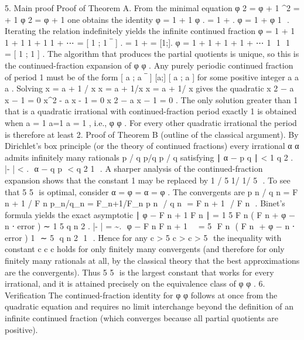 {{{{{{5. Main proof
Proof of Theorem A.
From the minimal equation
φ
2
=
φ
+
1
\varphi^2 = \varphi + 1
φ
2
=
φ
+
1
one obtains the identity
φ
=
1
+
1
φ
.
\varphi = 1 + .
φ
=
1
+
φ
1
​
.
Iterating the relation indefinitely yields the infinite continued fraction
φ
=
1
+
1
1
+
1
1
+
1
1
+
⋯
=
[
1
;
1
‾
]
.
\varphi = 1 +  = [1;].
φ
=
1
+
1
+
1
+
1
+
⋯
1
​
1
​
1
​
=
[
1
;
1
]
.
The algorithm that produces the partial quotients is unique, so this is the continued-fraction expansion of
φ
\varphi
φ
.
Any purely periodic continued fraction of period 1 must be of the form
[
a
;
a
‾
]
[a;]
[
a
;
a
]
for some positive integer
a
a
a
. Solving
x
=
a
+
1
/
x
x = a + 1/x
x
=
a
+
1/
x
gives the quadratic
x
2
−
a
x
−
1
=
0
x^2 - a x - 1 = 0
x
2
−
a
x
−
1
=
0
. The only solution greater than 1 that is a quadratic irrational with continued-fraction period exactly 1 is obtained when
a
=
1
a=1
a
=
1
, i.e.,
φ
\varphi
φ
. For every other quadratic irrational the period is therefore at least 2.
Proof of Theorem B (outline of the classical argument).
By Dirichlet’s box principle (or the theory of continued fractions) every irrational
α
\alpha
α
admits infinitely many rationals
p
/
q
p/q
p
/
q
satisfying
∣
α
−
p
q
∣
<
1
q
2
.
\bigl|\alpha - \bigr| < .
​
α
−
q
p
​
​
<
q
2
1
​
.
A sharper analysis of the continued-fraction expansion shows that the constant 1 may be replaced by
1
/
5
1/
1/
5
​
.
To see that
5
5
​
is optimal, consider
α
=
φ
\alpha = \varphi
α
=
φ
. The convergents are
p
n
/
q
n
=
F
n
+
1
/
F
n
p_n/q_n = F_{n+1}/F_n
p
n
​
/
q
n
​
=
F
n
+
1
​
/
F
n
​
. Binet’s formula yields the exact asymptotic
∣
φ
−
F
n
+
1
F
n
∣
=
1
5
F
n
(
F
n
+
φ
−
n
⋅
error
)
∼
1
5
q
n
2
.
\bigl|\varphi - \bigr| =  \sim {}.
​
φ
−
F
n
​
F
n
+
1
​
​
​
=
5
​
F
n
​
(
F
n
​
+
φ
−
n
⋅
error
)
1
​
∼
5
​
q
n
2
​
1
​
.
Hence for any
c
>
5
c > 
c
>
5
​
the inequality with constant
c
c
c
holds for only finitely many convergents (and therefore for only finitely many rationals at all, by the classical theory that the best approximations are the convergents).
Thus
5
5
​
is the largest constant that works for every irrational, and it is attained precisely on the equivalence class of
φ
\varphi
φ
.
6. Verification
The continued-fraction identity for
φ
\varphi
φ
follows at once from the quadratic equation and requires no limit interchange beyond the definition of an infinite continued fraction (which converges because all partial quotients are positive).
}}}}}}
